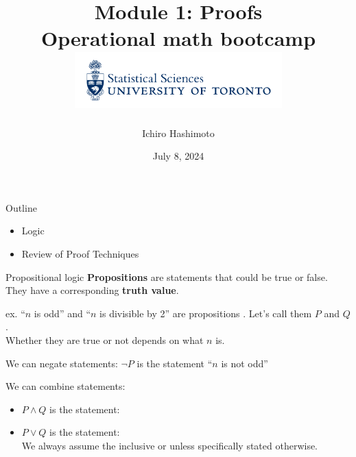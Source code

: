 \documentclass [aspectratio=169]{beamer}
\title[]{Module 1: Proofs \\ {\large Operational math bootcamp}\\ \includegraphics[width=8cm]{dept_logo.png}\vspace{-1em}}
\author[]{Ichiro Hashimoto}
\institute[]{University of Toronto}
\date{July 8, 2024}
\begin{document}
{
\begin{frame}
    \titlepage
\end{frame}
}

\begin{frame}{Outline}
    \begin{itemize}
      \setlength\itemsep{1em}
    	\item Logic
        \item Review of Proof Techniques
    \end{itemize}
\end{frame}


\begin{frame}{Propositional logic}{}
{\bf Propositions} are statements that could be true or false. They have a corresponding {\bf truth value}. \\

\vspace{1em}

ex. ``$n$ is odd'' and ``$n$ is divisible by 2'' are propositions . Let's call them $P$ and $Q$. \\

Whether they are true or not depends on what $n$ is. \\

\vspace{1em}

We can  negate statements: $\neg P$ is the statement ``$n$ is not odd''

\vspace{1em}
 We can combine statements: 
 \begin{itemize}
 \item $P \wedge Q$ is the statement:
 \item $P \vee Q$ is the statement: \\
 We always assume the inclusive or unless specifically stated otherwise.
\end{itemize}
\end{frame}
\end{document}
